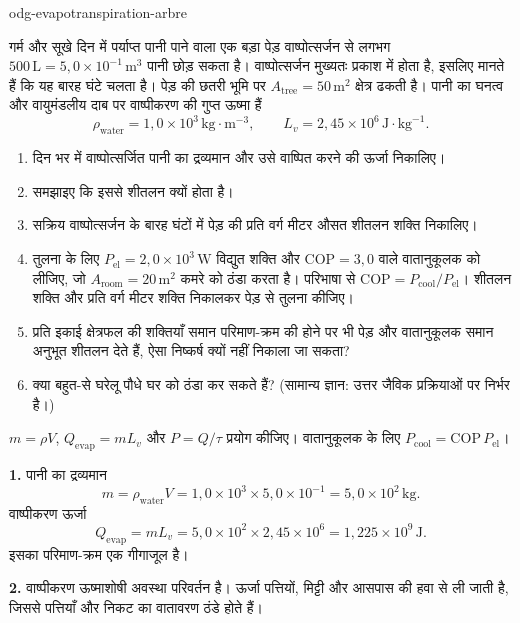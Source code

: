 \begin{exo}[एक बड़े पेड़ का वाष्पोत्सर्जन: प्राकृतिक वातानुकूलक?]{odg-evapotranspiration-arbre}

गर्म और सूखे दिन में पर्याप्त पानी पाने वाला एक बड़ा पेड़ वाष्पोत्सर्जन से लगभग $500\,\text{L}=5{,}0\times10^{-1}\,\text{m}^3$ पानी छोड़ सकता है। वाष्पोत्सर्जन मुख्यतः प्रकाश में होता है, इसलिए मानते हैं कि यह बारह घंटे चलता है। पेड़ की छतरी भूमि पर $A_{\text{tree}}=50\,\text{m}^2$ क्षेत्र ढकती है। पानी का घनत्व और वायुमंडलीय दाब पर वाष्पीकरण की गुप्त ऊष्मा हैं
\[
\rho_{\text{water}}=1{,}0\times10^3\,\text{kg}\!\cdot\!\text{m}^{-3},
\qquad L_v=2{,}45\times10^6\,\text{J}\!\cdot\!\text{kg}^{-1}.
\]
\begin{enumerate}
  \item दिन भर में वाष्पोत्सर्जित पानी का द्रव्यमान और उसे वाष्पित करने की ऊर्जा निकालिए।
  \item समझाइए कि इससे शीतलन क्यों होता है।
  \item सक्रिय वाष्पोत्सर्जन के बारह घंटों में पेड़ की प्रति वर्ग मीटर औसत शीतलन शक्ति निकालिए।
  \item तुलना के लिए $P_{\mathrm{el}}=2{,}0\times10^3\,\text{W}$ विद्युत शक्ति और $\mathrm{COP}=3{,}0$ वाले वातानुकूलक को लीजिए, जो $A_{\text{room}}=20\,\text{m}^2$ कमरे को ठंडा करता है। परिभाषा से $\mathrm{COP}=P_{\text{cool}}/P_{\mathrm{el}}$। शीतलन शक्ति और प्रति वर्ग मीटर शक्ति निकालकर पेड़ से तुलना कीजिए।
  \item प्रति इकाई क्षेत्रफल की शक्तियाँ समान परिमाण-क्रम की होने पर भी पेड़ और वातानुकूलक समान अनुभूत शीतलन देते हैं, ऐसा निष्कर्ष क्यों नहीं निकाला जा सकता?
  \item क्या बहुत-से घरेलू पौधे घर को ठंडा कर सकते हैं? (सामान्य ज्ञान: उत्तर जैविक प्रक्रियाओं पर निर्भर है।)
\end{enumerate}
\begin{indication}
$m=\rho V$, $Q_{\mathrm{evap}}=mL_v$ और $P=Q/\tau$ प्रयोग कीजिए। वातानुकूलक के लिए $P_{\text{cool}}=\mathrm{COP}\,P_{\mathrm{el}}$।
\end{indication}
\begin{solution}
\textbf{1.} पानी का द्रव्यमान
\[
m=\rho_{\text{water}}V=1{,}0\times10^3\times5{,}0\times10^{-1}
=5{,}0\times10^2\,\text{kg}.
\]
वाष्पीकरण ऊर्जा
\[
Q_{\mathrm{evap}}=mL_v=5{,}0\times10^2\times2{,}45\times10^6
=1{,}225\times10^9\,\text{J}.
\]
इसका परिमाण-क्रम एक गीगाजूल है।

\textbf{2.} वाष्पीकरण ऊष्माशोषी अवस्था परिवर्तन है। ऊर्जा पत्तियों, मिट्टी और आसपास की हवा से ली जाती है, जिससे पत्तियाँ और निकट का वातावरण ठंडे होते हैं।


\end{solution}
\end{exo}
